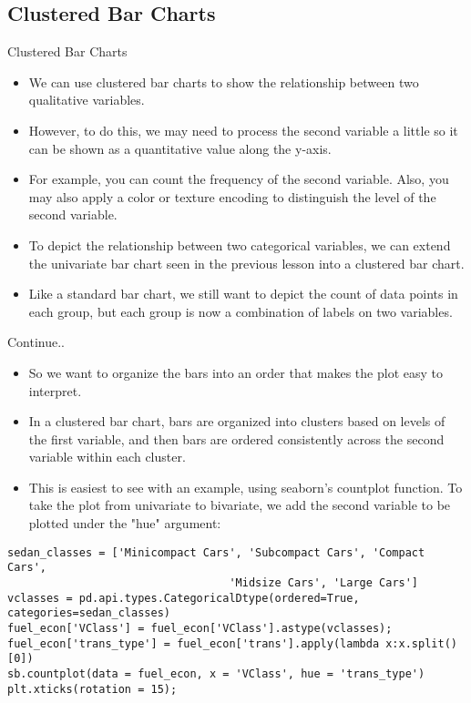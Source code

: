 \documentclass[12pt]{beamer}
\begin{document}
    \subsection{Clustered Bar Charts}
    \begin{frame}{Clustered Bar Charts}
    	\begin{itemize}
    		\item We can use clustered bar charts to show the relationship between two qualitative variables. 
    		\item However, to do this, we may need to process the second variable a little so it can be shown as a quantitative value along the y-axis.
    		\item For example, you can count the frequency of the second variable. Also, you may also apply a color or texture encoding to distinguish the level of the second variable.
    		\item To depict the relationship between two categorical variables, we can extend the univariate bar chart seen in the previous lesson into a clustered bar chart. 
    		\item Like a standard bar chart, we still want to depict the count of data points in each group, but each group is now a combination of labels on two variables.
    	\end{itemize}
    \end{frame}
    \begin{frame}[fragile]{Continue..}
    	\begin{itemize}
    		\item So we want to organize the bars into an order that makes the plot easy to interpret.
    		\item In a clustered bar chart, bars are organized into clusters based on levels of the first variable, and then bars are ordered consistently across the second variable within each cluster.
    		\item This is easiest to see with an example, using seaborn's countplot function. To take the plot from univariate to bivariate, we add the second variable to be plotted under the "hue" argument:
    	\end{itemize}
    
    \fontsize{8}{1}
    \vspace{0.3cm}
     \begin{verbatim}
sedan_classes = ['Minicompact Cars', 'Subcompact Cars', 'Compact Cars', 
                                  'Midsize Cars', 'Large Cars']
vclasses = pd.api.types.CategoricalDtype(ordered=True, categories=sedan_classes)
fuel_econ['VClass'] = fuel_econ['VClass'].astype(vclasses);
fuel_econ['trans_type'] = fuel_econ['trans'].apply(lambda x:x.split()[0])
sb.countplot(data = fuel_econ, x = 'VClass', hue = 'trans_type')
plt.xticks(rotation = 15);
     	\end{verbatim}
    \end{frame}
\end{document}

